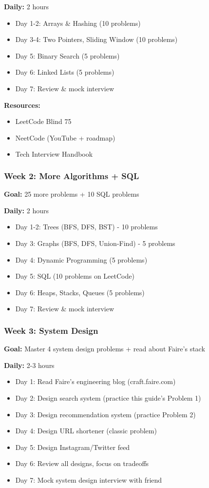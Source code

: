 \documentclass[11pt,letterpaper]{article}
\begin{document}
\textbf{Daily:} 2 hours
\begin{itemize}
    \item Day 1-2: Arrays \& Hashing (10 problems)
    \item Day 3-4: Two Pointers, Sliding Window (10 problems)
    \item Day 5: Binary Search (5 problems)
    \item Day 6: Linked Lists (5 problems)
    \item Day 7: Review \& mock interview
\end{itemize}

\textbf{Resources:}
\begin{itemize}
    \item LeetCode Blind 75
    \item NeetCode (YouTube + roadmap)
    \item Tech Interview Handbook
\end{itemize}

\subsubsection{Week 2: More Algorithms + SQL}

\textbf{Goal:} 25 more problems + 10 SQL problems

\textbf{Daily:} 2 hours
\begin{itemize}
    \item Day 1-2: Trees (BFS, DFS, BST) - 10 problems
    \item Day 3: Graphs (BFS, DFS, Union-Find) - 5 problems
    \item Day 4: Dynamic Programming (5 problems)
    \item Day 5: SQL (10 problems on LeetCode)
    \item Day 6: Heaps, Stacks, Queues (5 problems)
    \item Day 7: Review \& mock interview
\end{itemize}

\subsubsection{Week 3: System Design}

\textbf{Goal:} Master 4 system design problems + read about Faire's stack

\textbf{Daily:} 2-3 hours
\begin{itemize}
    \item Day 1: Read Faire's engineering blog (craft.faire.com)
    \item Day 2: Design search system (practice this guide's Problem 1)
    \item Day 3: Design recommendation system (practice Problem 2)
    \item Day 4: Design URL shortener (classic problem)
    \item Day 5: Design Instagram/Twitter feed
    \item Day 6: Review all designs, focus on tradeoffs
    \item Day 7: Mock system design interview with friend
\end{itemize}
\end{document}
